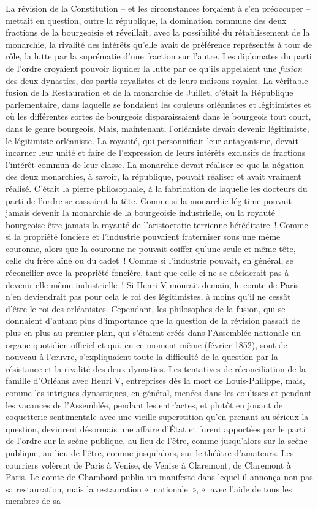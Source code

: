 \documentclass[french,twoside]{book} %
\begin{document}
La révision de la Constitution – et les circonstances forçaient à s’en préoccuper – mettait en question, outre la république, la domination commune des deux fractions de la bourgeoisie et réveillait, avec la possibilité du rétablissement de la monarchie, la rivalité des intérêts qu’elle avait de préférence représentés à tour de rôle, la lutte par la suprématie d’une fraction sur l’autre. Les diplomates du parti de l’ordre croyaient pouvoir liquider la lutte par ce qu’ils appelaient une \emph{fusion} des deux dynasties, des partis royalistes et de leurs maisons royales. La véritable fusion de la Restauration et de la monarchie de Juillet, c’était la République parlementaire, dans laquelle se fondaient les couleurs orléanistes et légitimistes et où les différentes sortes de bourgeois disparaissaient dans le bourgeois tout court, dans le genre bourgeois. Mais, maintenant, l’orléaniste devait devenir légitimiste, le légitimiste orléaniste. La royauté, qui personnifiait leur antagonisme, devait incarner leur unité et faire de l’expression de leurs intérêts exclusifs de fractions l’intérêt commun de leur classe. La monarchie devait réaliser ce que la négation des deux monarchies, à savoir, la république, pouvait réaliser et avait vraiment réalisé. C’était la pierre philosophale, à la fabrication de laquelle les docteurs du parti de l’ordre se cassaient la tête. Comme si la monarchie légitime pouvait jamais devenir la monarchie de la bourgeoisie industrielle, ou la royauté bourgeoise être jamais la royauté de l’aristocratie terrienne héréditaire ! Comme si la propriété foncière et l’industrie pouvaient fraterniser sous une même couronne, alors que la couronne ne pouvait coiffer qu’une seule et même tête, celle du frère aîné ou du cadet ! Comme si l’industrie pouvait, en général, se réconcilier avec la propriété foncière, tant que celle-ci ne se déciderait pas à devenir elle-même industrielle ! Si Henri V mourait demain, le comte de Paris n’en deviendrait pas pour cela le roi des légitimistes, à moins qu’il ne cessât d’être le roi des orléanistes. Cependant, les philosophes de la fusion, qui se donnaient d’autant plus d’importance que la question de la révision passait de plus en plus au premier plan, qui s’étaient créés dans l’Assemblée nationale un organe quotidien officiel et qui, en ce moment même (février 1852), sont de nouveau à l’œuvre, s’expliquaient toute la difficulté de la question par la résistance et la rivalité des deux dynasties. Les tentatives de réconciliation de la famille d’Orléans avec Henri V, entreprises dès la mort de Louis-Philippe, mais, comme les intrigues dynastiques, en général, menées dans les coulisses et pendant les vacances de l’Assemblée, pendant les entr’actes, et plutôt en jouant de coquetterie sentimentale avec une vieille superstition qu’en prenant au sérieux la question, devinrent désormais une affaire d’État et furent apportées par le parti de l’ordre sur la scène publique, au lieu de l’être, comme jusqu’alors sur la scène publique, au lieu de l’être, comme jusqu’alors, sur le théâtre d’amateurs. Les courriers volèrent de Paris à Venise, de Venise à Claremont, de Claremont à Paris. Le comte de Chambord publia un manifeste dans lequel il annonça non pas sa restauration, mais la restauration « nationale », « avec l’aide de tous les membres de sa 
\end{document}
